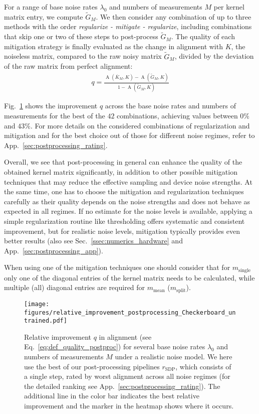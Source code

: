 \documentclass[twocolumn,superscriptaddress,nofootinbib]{revtex4-2}
\begin{document}
For a range of base noise rates $\lambda_0$ and numbers of measurements $M$ per kernel matrix entry, we compute $\tilde{G}_M$.
We then consider any combination of up to three methods with the order \emph{regularize - mitigate - regularize}, including combinations that skip one or two of these steps to post-process $\tilde{G}_M$.
The quality of each mitigation strategy is finally evaluated as the change in alignment with $K$, the noiseless matrix, compared to the raw noisy matrix $\tilde{G}_M$, divided by the deviation of the raw matrix from perfect alignment:
\begin{align}\label{eq:def_quality_postproc}
    q = \frac{\operatorname{A}(\overline{K}_M, K)-\operatorname{A}(\tilde{G}_M, K)}{1-\operatorname{A}(\tilde{G}_M, K)}
\end{align}

Fig.~\ref{fig:relative_improve_postprocessing} shows the improvement $q$ across the base noise rates and numbers of measurements for the best of the $42$ combinations, achieving values between $0\%$ and $43\%$.
For more details on the considered combinations of regularization and mitigation and for the best choice out of those for different noise regimes, refer to App.~\ref{sec:postprocessing_rating}.

Overall, we see that post-processing in general can enhance the quality of the obtained kernel matrix significantly, in addition to other possible mitigation techniques that may reduce the effective sampling and device noise strengths.
At the same time, one has to choose the mitigation and regularization techniques carefully as their quality depends on the noise strengths and does not behave as expected in all regimes. 
If no estimate for the noise levels is available, applying a simple regularization routine like thresholding offers systematic and consistent improvement, but for realistic noise levels, mitigation typically provides even better results (also see Sec.~\ref{ssec:numerics_hardware} and App.~\ref{sec:postprocessing_app}).

When using one of the mitigation techniques one should consider that for $m_{\text{single}}$ only one of the diagonal entries of the kernel matrix needs to be calculated, while multiple (all) diagonal entries are required for $m_{\text{mean}}$ ($m_{\text{split}}$).

\begin{figure}
    \centering
    \texttt{[image: figures/relative\_improvement\_postprocessing\_Checkerboard\_untrained.pdf]}
    \caption{Relative improvement $q$ in alignment (see Eq.~\eqref{eq:def_quality_postproc}) for several base noise rates $\lambda_0$ and numbers of measurements $M$ under a realistic noise model.
    We here use the best of our post-processing pipelines $r_\mathrm{SDP}$, which consists of a single step, rated by worst alignment across all noise regimes (for the detailed ranking see App.~\ref{sec:postprocessing_rating}).
    The additional line in the color bar indicates the best relative improvement and the marker in the heatmap shows where it occurs.
    }
    \label{fig:relative_improve_postprocessing}
\end{figure}
\end{document}
